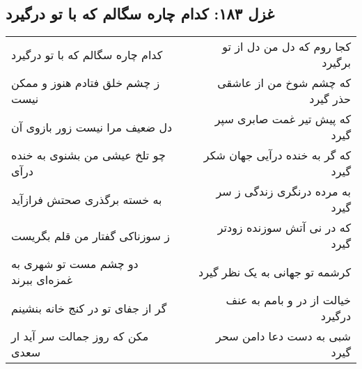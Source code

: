 \begin{center}
\section*{غزل ۱۸۳: کدام چاره سگالم که با تو درگیرد}
\label{sec:183}
\begin{longtable}{l p{0.5cm} r}
کدام چاره سگالم که با تو درگیرد
&&
کجا روم که دل من دل از تو برگیرد
\\
ز چشم خلق فتادم هنوز و ممکن نیست
&&
که چشم شوخ من از عاشقی حذر گیرد
\\
دل ضعیف مرا نیست زور بازوی آن
&&
که پیش تیر غمت صابری سپر گیرد
\\
چو تلخ عیشی من بشنوی به خنده درآی
&&
که گر به خنده درآیی جهان شکر گیرد
\\
به خسته برگذری صحتش فرازآید
&&
به مرده درنگری زندگی ز سر گیرد
\\
ز سوزناکی گفتار من قلم بگریست
&&
که در نی آتش سوزنده زودتر گیرد
\\
دو چشم مست تو شهری به غمزه‌ای ببرند
&&
کرشمه تو جهانی به یک نظر گیرد
\\
گر از جفای تو در کنج خانه بنشینم
&&
خیالت از در و بامم به عنف درگیرد
\\
مکن که روز جمالت سر آید ار سعدی
&&
شبی به دست دعا دامن سحر گیرد
\\
\end{longtable}
\end{center}
